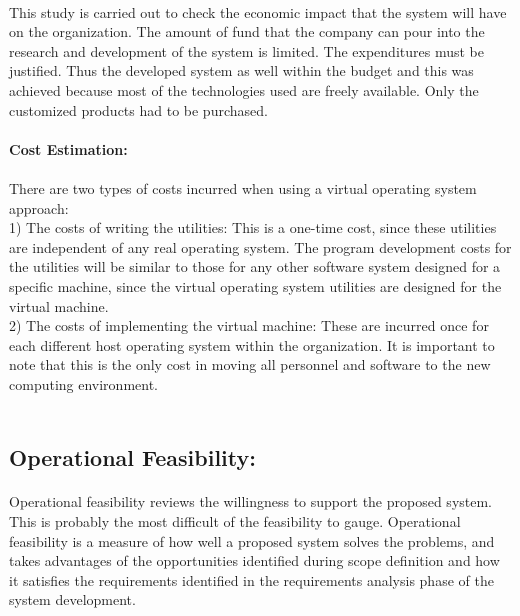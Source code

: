 \documentclass[11pt,a4paper]{report}
\begin{document}
\paragraph{}This study is carried out to check the economic impact that the system will have on the organization. The amount of fund that the company can pour into the research and development of the system is limited. The expenditures must be justified. Thus the developed system as well within the budget and this was achieved because most of the technologies used are freely available. Only the customized products had to be purchased.\\
\textbf{\\Cost Estimation:}
\paragraph{}There are two types of costs incurred when using a virtual operating system approach:\\
1)  The costs of writing the utilities: This is a one-time cost, since these utilities are independent of any real operating system. The program development costs for the utilities will be similar to those for any other software system designed for a specific machine, since the virtual operating system utilities are designed for the virtual machine.\\
2) The costs of implementing the virtual machine: These are incurred once for each different host operating system within the organization. It is
important to note that this is the only cost in moving all personnel and software to the new computing environment.\\
\\
\subsection{Operational Feasibility:}
\paragraph{}Operational feasibility reviews the willingness to support the proposed system. This is probably the most difficult of the feasibility to gauge. Operational feasibility is a measure of how well a proposed system solves the problems, and takes advantages of the opportunities identified during scope definition and how it satisfies the requirements identified in the requirements analysis phase of the system development.\\
\\
\end{document}
